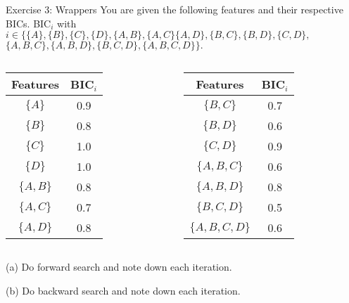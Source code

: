 \documentclass[aspectratio=169]{beamer}
\begin{document}
\begin{frame}{Exercise 3: Wrappers}
	You are given the following features and their respective BICs. BIC$_i$ with $i \in \{ \{A\}, \{B\}, \{C\}, \{D\}, \{A, B\}, \{A, C \} \{A, D \}, \{B, C \}, \{B, D\}, \{C, D\}, $ $\{A, B, C\}, \{A, B, D\}, \{B, C, D\}, \{A, B, C, D\}\}.$
	\begin{columns}
		\begin{column}{0.3\textwidth}
			\centering
			\begin{table}
				\centering
				\begin{tabular}{c c}
					Features & BIC$_i$ \\
					\hline
					$\{A\}$ & 0.9 \\
					$\{B\}$ & 0.8 \\
					$\{C\}$ & 1.0 \\
					$\{D\}$ & 1.0 \\
					$\{A, B\}$ & 0.8 \\
					$\{A, C\}$ & 0.7 \\
					$\{A, D\}$ & 0.8 \\
				\end{tabular}
			\end{table}
		\end{column}
		\begin{column}{0.3 \textwidth}
			\centering
			\begin{table}
				\centering
				\begin{tabular}{c c}
					Features & BIC$_i$ \\
					\hline
					$\{B, C\}$ & 0.7 \\
					$\{B, D\}$ & 0.6 \\
					$\{C, D\}$ & 0.9 \\
					$\{A, B, C\}$ & 0.6 \\
					$\{A, B, D\}$ & 0.8 \\
					$\{B, C, D\}$ & 0.5 \\
					$\{A, B, C, D\}$ & 0.6 \\
				\end{tabular}
			\end{table}	
		\end{column}
		\hfill
	\end{columns}
	(a) Do forward search and note down each iteration.
	
	(b) Do backward search and note down each iteration.
\end{frame}
\end{document}
